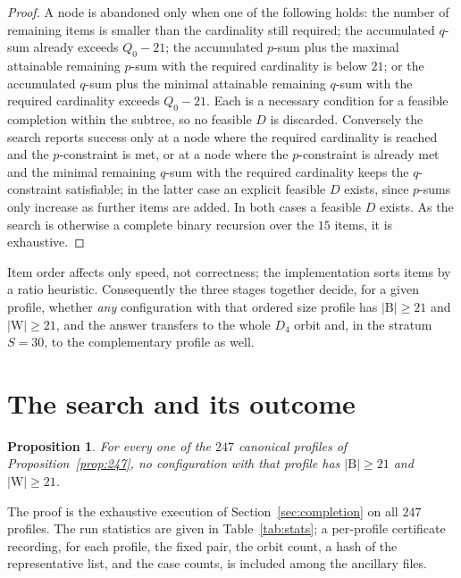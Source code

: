 \documentclass[11pt]{amsart}
\newtheorem{proposition}[theorem]{Proposition}
\theoremstyle{remark}
\newcommand{\Bl}{\mathrm{B}}
\newcommand{\Wh}{\mathrm{W}}
\begin{document}
\begin{proof}
A node is abandoned only when one of the following holds: the number of remaining items is smaller than the cardinality still required; the accumulated $q$-sum already exceeds $Q_0-21$; the accumulated $p$-sum plus the maximal attainable remaining $p$-sum with the required cardinality is below $21$; or the accumulated $q$-sum plus the minimal attainable remaining $q$-sum with the required cardinality exceeds $Q_0-21$. Each is a necessary condition for a feasible completion within the subtree, so no feasible $D$ is discarded. Conversely the search reports success only at a node where the required cardinality is reached and the $p$-constraint is met, or at a node where the $p$-constraint is already met and the minimal remaining $q$-sum with the required cardinality keeps the $q$-constraint satisfiable; in the latter case an explicit feasible $D$ exists, since $p$-sums only increase as further items are added. In both cases a feasible $D$ exists. As the search is otherwise a complete binary recursion over the $15$ items, it is exhaustive.
\end{proof}

Item order affects only speed, not correctness; the implementation sorts items by a ratio heuristic. Consequently the three stages together decide, for a given profile, whether \emph{any} configuration with that ordered size profile has $|\Bl|\ge 21$ and $|\Wh|\ge 21$, and the answer transfers to the whole $D_4$ orbit and, in the stratum $S=30$, to the complementary profile as well.

\section{The search and its outcome}\label{sec:result}

\begin{proposition}\label{prop:unsat}
For every one of the $247$ canonical profiles of Proposition~\ref{prop:247}, no configuration with that profile has $|\Bl|\ge 21$ and $|\Wh|\ge 21$.
\end{proposition}

The proof is the exhaustive execution of Section~\ref{sec:completion} on all $247$ profiles. The run statistics are given in Table~\ref{tab:stats}; a per-profile certificate recording, for each profile, the fixed pair, the orbit count, a hash of the representative list, and the case counts, is included among the ancillary files.
\end{document}
